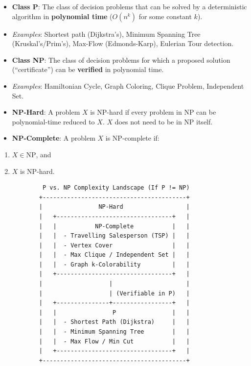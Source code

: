 \documentclass[
]{book}
\providecommand{\tightlist}{%
  \setlength{\itemsep}{0pt}\setlength{\parskip}{0pt}}
\theoremstyle{definition}
\theoremstyle{definition}
\theoremstyle{definition}
\theoremstyle{definition}
\theoremstyle{remark}
\begin{document}
\begin{itemize}
\item
  \textbf{Class P}: The class of decision problems that can be solved by a deterministic algorithm in \textbf{polynomial time} (\(O(n^k)\) for some constant \(k\)).
\item
  \emph{Examples}: Shortest path (Dijkstra's), Minimum Spanning Tree (Kruskal's/Prim's), Max-Flow (Edmonds-Karp), Eulerian Tour detection.
\item
  \textbf{Class NP}: The class of decision problems for which a proposed solution (``certificate'') can be \textbf{verified} in polynomial time.
\item
  \emph{Examples}: Hamiltonian Cycle, Graph Coloring, Clique Problem, Independent Set.
\item
  \textbf{NP-Hard}: A problem \(X\) is NP-hard if every problem in NP can be polynomial-time reduced to \(X\). \(X\) does not need to be in NP itself.
\item
  \textbf{NP-Complete}: A problem \(X\) is NP-complete if:
\end{itemize}

\begin{enumerate}
\def\labelenumi{\arabic{enumi}.}
\tightlist
\item
  \(X \in \text{NP}\), and
\item
  \(X\) is NP-hard.
\end{enumerate}

\begin{verbatim}
            P vs. NP Complexity Landscape (If P != NP)
           +-----------------------------------------+
           |                NP-Hard                  |
           |   +---------------------------------+   |
           |   |           NP-Complete           |   |
           |   |  - Travelling Salesperson (TSP) |   |
           |   |  - Vertex Cover                 |   |
           |   |  - Max Clique / Independent Set |   |
           |   |  - Graph k-Colorability         |   |
           |   +---------------------------------+   |
           |                   |                     |
           |                   | (Verifiable in P)   |
           |   +---------------+-----------------+   |
           |   |                P                |   |
           |   |  - Shortest Path (Dijkstra)     |   |
           |   |  - Minimum Spanning Tree        |   |
           |   |  - Max Flow / Min Cut           |   |
           |   +---------------------------------+   |
           +-----------------------------------------+
\end{verbatim}
\end{document}
